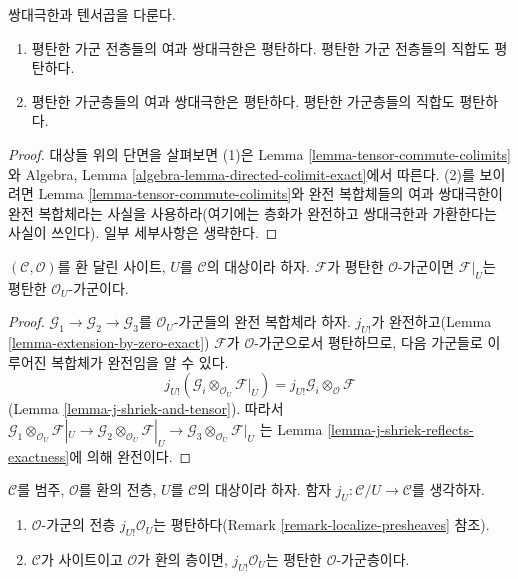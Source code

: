 \begin{lemma}
\label{lemma-colimits-flat}
쌍대극한과 텐서곱을 다룬다.
\begin{enumerate}
\item 평탄한 가군 전층들의 여과 쌍대극한은 평탄하다. 평탄한 가군 전층들의
직합도 평탄하다.
\item 평탄한 가군층들의 여과 쌍대극한은 평탄하다. 평탄한 가군층들의 직합도
평탄하다.
\end{enumerate}
\end{lemma}

\begin{proof}
대상들 위의 단면을 살펴보면 (1)은 Lemma
\ref{lemma-tensor-commute-colimits}와 Algebra, Lemma
\ref{algebra-lemma-directed-colimit-exact}에서 따른다. (2)를 보이려면 Lemma
\ref{lemma-tensor-commute-colimits}와 완전 복합체들의 여과 쌍대극한이 완전
복합체라는 사실을 사용하라(여기에는 층화가 완전하고 쌍대극한과 가환한다는
사실이 쓰인다). 일부 세부사항은 생략한다.
\end{proof}

\begin{lemma}
\label{lemma-restriction-flat}
$(\mathcal{C}, \mathcal{O})$를 환 달린 사이트, $U$를 $\mathcal{C}$의
대상이라 하자. $\mathcal{F}$가 평탄한 $\mathcal{O}$-가군이면
$\mathcal{F}|_U$는 평탄한 $\mathcal{O}_U$-가군이다.
\end{lemma}

\begin{proof}
$\mathcal{G}_1 \to \mathcal{G}_2 \to \mathcal{G}_3$를
$\mathcal{O}_U$-가군들의 완전 복합체라 하자. $j_{U!}$가 완전하고(Lemma
\ref{lemma-extension-by-zero-exact}) $\mathcal{F}$가
$\mathcal{O}$-가군으로서 평탄하므로, 다음 가군들로 이루어진 복합체가
완전임을 알 수 있다.
$$
j_{U!}(\mathcal{G}_i \otimes_{\mathcal{O}_U} \mathcal{F}|_U) =
j_{U!}\mathcal{G}_i \otimes_\mathcal{O} \mathcal{F}
$$
(Lemma \ref{lemma-j-shriek-and-tensor}). 따라서
$\mathcal{G}_1 \otimes_{\mathcal{O}_U} \mathcal{F}|_U \to
\mathcal{G}_2 \otimes_{\mathcal{O}_U} \mathcal{F}|_U \to
\mathcal{G}_3 \otimes_{\mathcal{O}_U} \mathcal{F}|_U$
는 Lemma \ref{lemma-j-shriek-reflects-exactness}에 의해 완전이다.
\end{proof}

\begin{lemma}
\label{lemma-j-shriek-flat}
$\mathcal{C}$를 범주, $\mathcal{O}$를 환의 전층, $U$를 $\mathcal{C}$의
대상이라 하자. 함자 $j_U : \mathcal{C}/U \to \mathcal{C}$를 생각하자.
\begin{enumerate}
\item $\mathcal{O}$-가군의 전층 $j_{U!}\mathcal{O}_U$는 평탄하다(Remark
\ref{remark-localize-presheaves} 참조).
\item $\mathcal{C}$가 사이트이고 $\mathcal{O}$가 환의 층이면,
$j_{U!}\mathcal{O}_U$는 평탄한 $\mathcal{O}$-가군층이다.
\end{enumerate}
\end{lemma}

